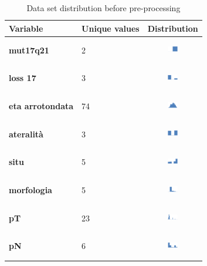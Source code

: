 \begin{table}[htbp]
\caption{Data set distribution before pre-processing}
\begin{tabularx}{\textwidth}{@{} l X c @{}}
\toprule 
\textbf{Variable} & Unique values & Distribution \\
\midrule 
\textbf{mut17q21} & 2 & \includegraphics[width=0.2\textwidth, height=10mm]{methodology/images/mut17q21}  \\
\textbf{loss 17} & 3 & \includegraphics[width=0.2\textwidth, height=10mm]{methodology/images/loss_17}\\
\textbf{eta arrotondata} & 74 & \includegraphics[width=0.2\textwidth, height=10mm]{methodology/images/eta_arrotondata}\\
\textbf{ateralit\`a} & 3 & \includegraphics[width=0.2\textwidth, height=10mm]{methodology/images/lateralita} \\
\textbf{situ} & 5 & \includegraphics[width=0.2\textwidth, height=10mm]{methodology/images/situ} \\
\textbf{morfologia} & 5 & \includegraphics[width=0.2\textwidth, height=10mm]{methodology/images/morfologia} \\
\textbf{pT} & 23 & \includegraphics[width=0.2\textwidth, height=10mm]{methodology/images/pt} \\
\textbf{pN} & 6 & \includegraphics[width=0.2\textwidth, height=10mm]{methodology/images/pn} \\

\end{tabularx}
\end{table}
